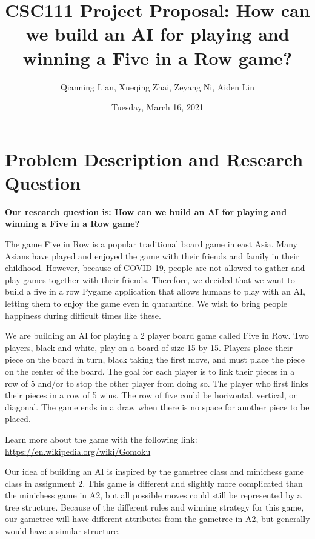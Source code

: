 \documentclass[fontsize=11pt]{article}
\title{CSC111 Project Proposal: How can we build an AI for playing and winning a Five in a Row game?}
\author{Qianning Lian, Xueqing Zhai, Zeyang Ni, Aiden Lin}
\date{Tuesday, March 16, 2021}
\begin{document}
\maketitle

\section*{Problem Description and Research Question}

\textbf{Our research question is: How can we build an AI for playing and winning a Five in a Row game?}

The game Five in Row is a popular traditional board game in east Asia. Many Asians have played and enjoyed the game with their friends and family in their childhood. However, because of COVID-19, people are not allowed to gather and play games together with their friends. Therefore, we decided that we want to build a five in a row Pygame application that allows humans to play with an AI, letting them to enjoy the game even in quarantine. We wish to bring people happiness during difficult times like these. 

We are building an AI for playing a 2 player board game called Five in Row. Two players, black and white, play on a board of size 15 by 15. Players place their piece on the board in turn, black taking the first move, and must place the piece on the center of the board. The goal for each player is to link their pieces in a row of 5 and/or to stop the other player from doing so. The player who first links their pieces in a row of 5 wins. The row of five could be horizontal, vertical, or diagonal. The game ends in a draw when there is no space for another piece to be placed. 

Learn more about the game with the following link: 
\url{https://en.wikipedia.org/wiki/Gomoku}

Our idea of building an AI is inspired by the gametree class and minichess game class in assignment 2. This game is different and slightly more complicated than the minichess game in A2, but all possible moves could still be represented by a tree structure. Because of the different rules and winning strategy for this game, our gametree will have different attributes from the gametree in A2, but generally would have a similar structure.
\end{document}
